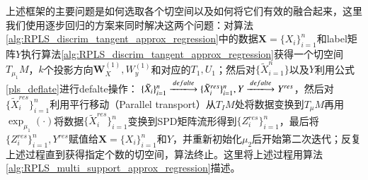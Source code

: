 上述框架的主要问题是如何选取各个切空间以及如何将它们有效的融合起来，这里我们使用逐步回归的方案来同时解决这两个问题：对算法\ref{alg:RPLS_discrim_tangent_approx_regression}中的数据$\bm{X}=\{X_i\}_{i=1}^{n}$和label矩阵${Y}$执行算法\ref{alg:RPLS_discrim_tangent_approx_regression}获得一个切空间$T_{\mu_1}M$，$k$个投影方向$\bm{W}_{X}^{(1)},W_{y}^{(1)}$和对应的$T_{1},U_{1}$；然后对$\{\tilde{X}_{i=1}^{n}\}$以及$Y$利用公式\ref{pls_deflate}进行defalte操作：%
$\{\tilde{X}_{i}\}_{i=1}^{n} \xlongrightarrow{defalte} \{\tilde{X}^{res}_i\}_{i=1}^{n},{Y}\xlongrightarrow{defalte} {Y}^{res}$，然后对$\{\tilde{X}^{res}_{i}\}_{i=1}^{n}$利用平行移动（Parallel transport\cite{RCCA}）从$T_{I}M$处将数据变换到$T_{\mu}M$再用$\exp_{\mu_{1}}(\cdot)$将数据$\{\tilde{X}^{res}_i\}_{i=1}^{n}$变换到SPD矩阵流形得到$\{Z^{res}_{i}\}_{i=1}^{n}$，最后将$\{Z^{res}_i\}_{i=1}^{n},{Y}^{res}$赋值给$\bm{X}=\{X_i\}_{i=1}^{n}$和$Y$，并重新初始化$\mu_2$后开始第二次迭代；反复上述过程直到获得指定个数的切空间，算法终止。这里将上述过程用算法\ref{alg:RPLS_multi_support_approx_regression}描述。
